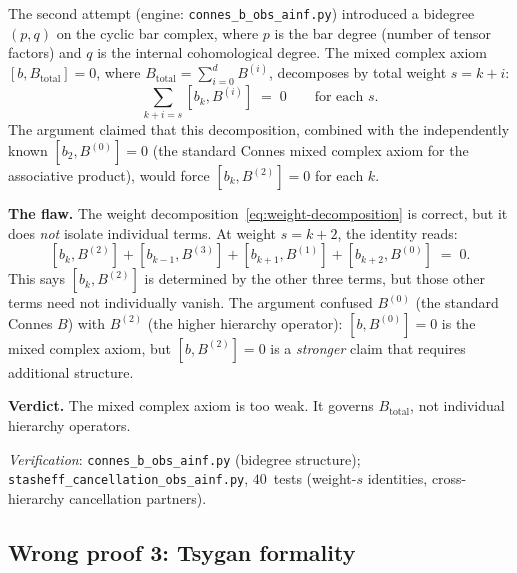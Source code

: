 \begin{remark}
\label{rem:wrong-proof-bidegree}
The second attempt (engine: \texttt{connes\_b\_obs\_ainf.py})
introduced a bidegree $(p, q)$ on the cyclic bar complex, where
$p$ is the bar degree (number of tensor factors) and $q$ is the
internal cohomological degree.  The mixed complex axiom
$[b, B_{\mathrm{total}}] = 0$, where
$B_{\mathrm{total}} = \sum_{i=0}^{d} B^{(i)}$, decomposes by
total weight $s = k + i$:
\begin{equation}
\label{eq:weight-decomposition}
 \sum_{k + i = s} [b_k, B^{(i)}] \;=\; 0
 \qquad \text{for each } s.
\end{equation}
The argument claimed that this decomposition, combined with the
independently known $[b_2, B^{(0)}] = 0$ (the standard Connes
mixed complex axiom for the associative product), would force
$[b_k, B^{(2)}] = 0$ for each $k$.

\textbf{The flaw.}  The weight decomposition~\eqref{eq:weight-decomposition}
is correct, but it does \emph{not} isolate individual terms.
At weight $s = k + 2$, the identity reads:
\[
 [b_k, B^{(2)}] + [b_{k-1}, B^{(3)}]
 + [b_{k+1}, B^{(1)}] + [b_{k+2}, B^{(0)}] \;=\; 0.
\]
This says $[b_k, B^{(2)}]$ is determined by the other three
terms, but those other terms need not individually vanish.
The argument confused
$B^{(0)}$ (the standard Connes $B$) with $B^{(2)}$
(the higher hierarchy operator): $[b, B^{(0)}] = 0$ is the
mixed complex axiom, but $[b, B^{(2)}] = 0$ is a
\emph{stronger} claim that requires additional structure.

\textbf{Verdict.}  The mixed complex axiom is too weak.  It
governs $B_{\mathrm{total}}$, not individual hierarchy
operators.

\noindent\textit{Verification}: \texttt{connes\_b\_obs\_ainf.py}
(bidegree structure); \texttt{stasheff\_cancellation\_obs\_ainf.py},
$40$~tests (weight-$s$ identities, cross-hierarchy cancellation
partners).
\end{remark}


\subsection{Wrong proof 3: Tsygan formality}
\label{subsec:wrong-tsygan}

